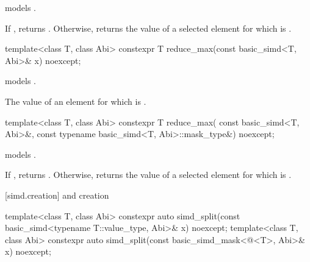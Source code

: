 \begin{itemdescr}
  \pnum\constraints
   models .

  \pnum\returns
  If , returns .
  Otherwise, returns the value of a selected element  for which  is  \forallmaskedi.
\end{itemdescr}

\begin{itemdecl}
template<class T, class Abi> constexpr T reduce_max(const basic_simd<T, Abi>& x) noexcept;
\end{itemdecl}

\begin{itemdescr}
  \pnum\constraints
   models .

  \pnum\returns
  The value of an element  for which  is  \foralli.
\end{itemdescr}

\begin{itemdecl}
template<class T, class Abi>
  constexpr T reduce_max(
    const basic_simd<T, Abi>&, const typename basic_simd<T, Abi>::mask_type&) noexcept;
\end{itemdecl}

\begin{itemdescr}
  \pnum\constraints
   models .

  \pnum\returns
  If , returns .
  Otherwise, returns the value of a selected element  for which  is  \forallmaskedi.
\end{itemdescr}

[simd.creation]{ and  creation}

\begin{itemdecl}
template<class T, class Abi>
  constexpr auto simd_split(const basic_simd<typename T::value_type, Abi>& x) noexcept;
template<class T, class Abi>
  constexpr auto simd_split(const basic_simd_mask<@\maskelementsize@<T>, Abi>& x) noexcept;
\end{itemdecl}

